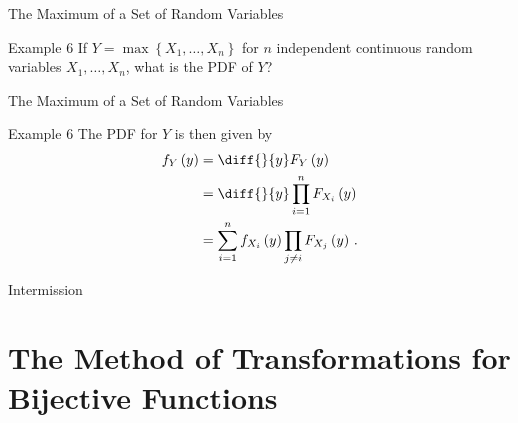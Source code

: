 \documentclass[10pt]{beamer}
\begin{document}
\begin{frame}[fragile]{The Maximum of a Set of Random Variables}
\begin{exampleblock}{Example 6}
If \(Y = \max\left\{X_1, \dots, X_n\right\}\) for \(n\) independent continuous random variables \(X_1, \dots, X_n\), what is the PDF of \(Y\)?
\end{exampleblock}
\end{frame}

\begin{frame}[fragile]{The Maximum of a Set of Random Variables}
\begin{exampleblock}{Example 6}
The PDF for \(Y\) is then given by
\begin{equation*}
\begin{aligned}
    f_Y\left(y\right) &= \diff{}{y}F_Y\left(y\right)\\
    &= \diff{}{y}\prod_{i=1}^n F_{X_i}\left(y\right)\\
    &= \sum_{i=1}^n f_{X_i}\left(y\right)\prod_{j\neq i} F_{X_j}\left(y\right)\,.
\end{aligned}
\end{equation*}
\end{exampleblock}
\end{frame}

\begin{frame}[standout]
Intermission
\end{frame}

\section{The Method of Transformations for Bijective Functions}
\end{document}

